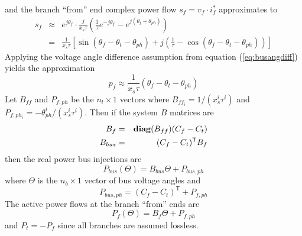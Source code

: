 and the branch ``from'' end complex power flow $s_f = v_f \cdot i_f^*$
approximates to
\begin{eqnarray}
s_f& \approx& e^{j\theta_f} \cdot \frac{j}{x_s\tau}
(\frac{1}{\tau}e^{-j\theta_f} - e^{j(\theta_t + \theta_{ph})})\\
& =& \frac{1}{x_s\tau} \left[ \sin(\theta_f-\theta_t-\theta_{ph}) +
j\left( \frac{1}{\tau} - \cos(\theta_f-\theta_t-\theta_{ph}) \right) \right]
\end{eqnarray}
Applying the voltage angle difference assumption from equation
(\ref{eq:busangdiff}) yields the approximation
\begin{equation}
p_f \approx \frac{1}{x_s\tau}(\theta_f-\theta_t-\theta_{ph})
\end{equation}
Let $B_{ff}$ and $P_{f,ph}$ be the $n_l \times 1$ vectors where
$B_{ff_i} = 1 / (x_s^i\tau^i)$ and $P_{f,ph_i} =
-\theta_{ph}^i / (x_s^i\tau^i)$.  Then if the system $B$ matrices are
\begin{eqnarray}
B_f& =& \mathop{\mathbf{diag}}(B_{ff})(C_f-C_t)\\
B_{bus}& = &(C_f-C_t)^\mathsf{T}B_f
\end{eqnarray}
then the real power bus injections are
\begin{equation}
\label{eq:bbus}
P_{bus}(\Theta) = B_{bus}\Theta + P_{bus,ph}
\end{equation}
where $\Theta$ is the $n_b \times 1$ vector of bus voltage angles and
\begin{equation}
P_{bus,ph} = (C_f-C_t)^\mathsf{T} + P_{f,ph}
\end{equation}
The active power flows at the branch ``from'' ends are
\begin{equation}
\label{eq:pf_loss}
P_f(\Theta) = B_f\Theta + P_{f,ph}
\end{equation}
and $P_t = -P_f$ since all branches are assumed lossless.


